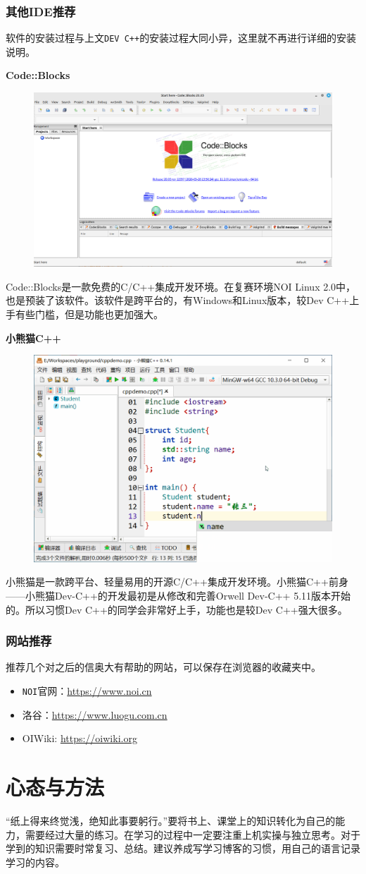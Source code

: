\subsubsection{其他IDE推荐}
软件的安装过程与上文\texttt{DEV C++}的安装过程大同小异，这里就不再进行详细的安装说明。

\noindent\textbf{Code::Blocks}
\begin{figure}[H]
\centering
\includegraphics[width=0.6\linewidth]{01chapter/img/codeblocks}
\caption{}
\label{fig:codeblocks}
\end{figure}


Code::Blocks是一款免费的C/C++集成开发环境。在复赛环境NOI Linux 2.0中，也是预装了该软件。该软件是跨平台的，有Windows和Linux版本，较Dev C++上手有些门槛，但是功能也更加强大。

\noindent\textbf{小熊猫C++}

\begin{figure}[H]
\centering
\includegraphics[width=0.6\linewidth]{01chapter/img/codeintellisense}
\caption{}
\label{fig:codeintellisense}
\end{figure}


小熊猫是一款跨平台、轻量易用的开源C/C++集成开发环境。小熊猫C++前身——小熊猫Dev-C++的开发最初是从修改和完善Orwell Dev-C++ 5.11版本开始的。所以习惯Dev C++的同学会非常好上手，功能也是较Dev C++强大很多。

\subsubsection{网站推荐}
推荐几个对之后的信奥大有帮助的网站，可以保存在浏览器的收藏夹中。
\begin{itemize}
\item \texttt{NOI}官网：\href{https://www.noi.cn}{https://www.noi.cn}
\item 洛谷：\href{https://www.luogu.com.cn}{https://www.luogu.com.cn}
\item OIWiki: \href{https://oiwiki.org}{https://oiwiki.org}
\end{itemize}

\section{心态与方法}
“纸上得来终觉浅，绝知此事要躬行。”要将书上、课堂上的知识转化为自己的能力，需要经过大量的练习。在学习的过程中一定要注重上机实操与独立思考。对于学到的知识需要时常复习、总结。建议养成写学习博客的习惯，用自己的语言记录学习的内容。


